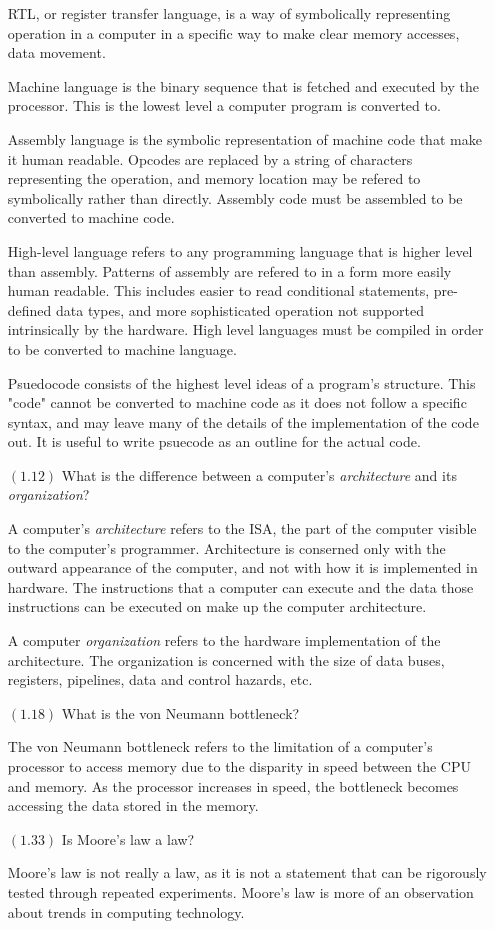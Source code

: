 \documentclass[letterpaper,10pt,titlepage]{article}
\begin{document}
\begin{enumerate}
	RTL, or register transfer language, is a way of symbolically representing operation in a computer
	in a specific way to make clear memory accesses, data movement. 
	
	Machine language is the binary sequence that is fetched and executed by the processor. This is
	the lowest level a computer program is converted to.
	
	Assembly language is the symbolic representation of machine code that make it human readable. 
	Opcodes are replaced by a string of characters representing the operation, and memory location may
	be refered to symbolically rather than directly. Assembly code must be assembled to be converted to
	machine code.
	
	High-level language refers to any programming language that is higher level than assembly. Patterns of assembly
	are refered to in a form more easily human readable. This includes easier to read conditional statements,
	pre-defined data types, and more sophisticated operation not supported intrinsically by the hardware. High level
	languages must be compiled in order to be converted to machine language.
	
	Psuedocode consists of the highest level ideas of a program's structure. This "code" cannot be converted to 
	machine code as it does not follow a specific syntax, and may leave many of the details of the implementation
	of the code out. It is useful to write psuecode as an outline for the actual code. 

\item[$(1.12)$]What is the difference between a computer's \textit{architecture} and its
  \textit{organization}?
  
  A computer's \textit{architecture} refers to the ISA, the part of the computer visible to the computer's 
  programmer. Architecture is conserned only with the outward appearance of the computer, and not with how it
  is implemented in hardware. The instructions that a computer can execute and the data those instructions can be
  executed on make up the computer architecture.
  
  A computer \textit{organization} refers to the hardware implementation of the architecture. The organization is concerned with the size of data buses, registers, pipelines, data and control hazards, etc.
\item[$(1.18)$]What is the von Neumann bottleneck?

The von Neumann bottleneck refers to the limitation of a computer's processor to access memory due to the disparity in speed between the CPU and memory. As the processor increases in speed, the bottleneck becomes accessing the data stored in the memory. 

\item[$(1.33)$]Is Moore's law a law?

Moore's law is not really a law, as it is not a statement that can be rigorously tested through repeated experiments.  Moore's law is more of an observation about trends in computing technology.

\end{enumerate}
\end{document}
